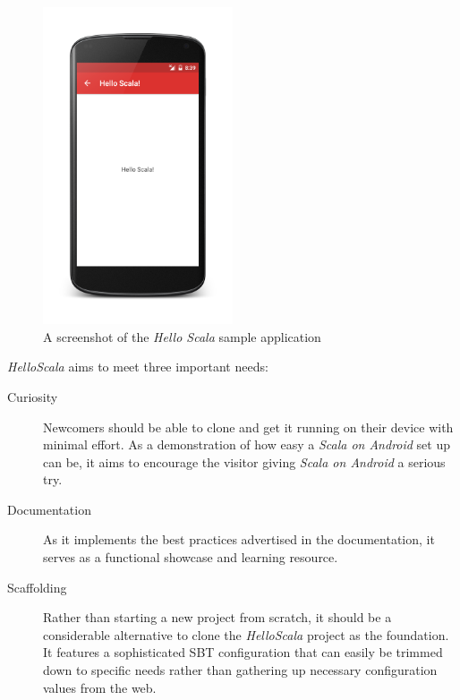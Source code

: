 \begin{description}
	\begin{figure}[ht]
		\center
		\includegraphics[width=0.5\textwidth]{asset/hello-scala.png}
		\caption{A screenshot of the \textit{Hello Scala} sample application}
		\label{hello-scala}
	\end{figure}

	\textit{HelloScala} aims to meet three important needs:

	\begin{description}

		\item[Curiosity]\hfill

		Newcomers should be able to clone and get it running on their device with minimal effort. As a demonstration of how easy a \textit{Scala on Android} set up can be, it aims to encourage the visitor giving \textit{Scala on Android} a serious try.

		\item[Documentation]\hfill

		As it implements the best practices advertised in the documentation, it serves as a functional showcase and learning resource.

		\item[Scaffolding]\hfill

		Rather than starting a new project from scratch, it should be a considerable alternative to clone the \textit{HelloScala} project as the foundation. It features a sophisticated \ac{SBT} configuration that can easily be trimmed down to specific needs rather than gathering up necessary configuration values from the web.

	\end{description}

\end{description}